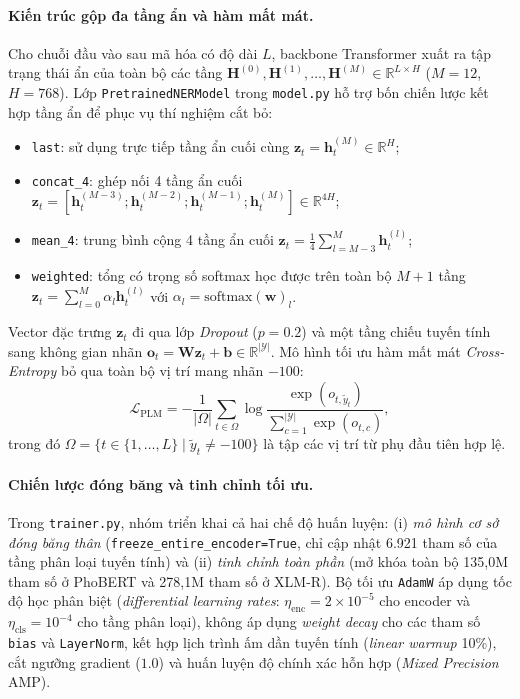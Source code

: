 \paragraph{Kiến trúc gộp đa tầng ẩn và hàm mất mát.}
Cho chuỗi đầu vào sau mã hóa có độ dài $L$, backbone Transformer xuất ra tập trạng thái ẩn của toàn bộ các tầng $\mathbf{H}^{(0)}, \mathbf{H}^{(1)}, \dots, \mathbf{H}^{(M)} \in \mathbb{R}^{L \times H}$ ($M=12$, $H=768$). Lớp \texttt{PretrainedNERModel} trong \texttt{model.py} hỗ trợ bốn chiến lược kết hợp tầng ẩn để phục vụ thí nghiệm cắt bỏ:
\begin{itemize}
    \item \texttt{last}: sử dụng trực tiếp tầng ẩn cuối cùng $\mathbf{z}_t = \mathbf{h}_t^{(M)} \in \mathbb{R}^{H}$;
    \item \texttt{concat\_4}: ghép nối 4 tầng ẩn cuối $\mathbf{z}_t = [\mathbf{h}_t^{(M-3)}; \mathbf{h}_t^{(M-2)}; \mathbf{h}_t^{(M-1)}; \mathbf{h}_t^{(M)}] \in \mathbb{R}^{4H}$;
    \item \texttt{mean\_4}: trung bình cộng 4 tầng ẩn cuối $\mathbf{z}_t = \frac{1}{4}\sum_{l=M-3}^{M} \mathbf{h}_t^{(l)}$;
    \item \texttt{weighted}: tổng có trọng số softmax học được trên toàn bộ $M+1$ tầng $\mathbf{z}_t = \sum_{l=0}^{M} \alpha_l \mathbf{h}_t^{(l)}$ với $\alpha_l = \text{softmax}(\mathbf{w})_l$.
\end{itemize}
Vector đặc trưng $\mathbf{z}_t$ đi qua lớp \textit{Dropout} ($p=0.2$) và một tầng chiếu tuyến tính sang không gian nhãn $\mathbf{o}_t = \mathbf{W}\mathbf{z}_t + \mathbf{b} \in \mathbb{R}^{|\mathcal{Y}|}$. Mô hình tối ưu hàm mất mát \textit{Cross-Entropy} bỏ qua toàn bộ vị trí mang nhãn $-100$:
\begin{equation}
    \mathcal{L}_{\text{PLM}} = -\frac{1}{|\Omega|} \sum_{t \in \Omega} \log \frac{\exp(o_{t, \tilde{y}_t})}{\sum_{c=1}^{|\mathcal{Y}|} \exp(o_{t, c})},
\end{equation}
trong đó $\Omega = \{t \in \{1, \dots, L\} \mid \tilde{y}_t \neq -100\}$ là tập các vị trí từ phụ đầu tiên hợp lệ.

\paragraph{Chiến lược đóng băng và tinh chỉnh tối ưu.}
Trong \texttt{trainer.py}, nhóm triển khai cả hai chế độ huấn luyện: (i) \textit{mô hình cơ sở đóng băng thân} (\texttt{freeze\_entire\_encoder=True}, chỉ cập nhật 6.921 tham số của tầng phân loại tuyến tính) và (ii) \textit{tinh chỉnh toàn phần} (mở khóa toàn bộ 135,0M tham số ở PhoBERT và 278,1M tham số ở XLM-R). Bộ tối ưu \texttt{AdamW} áp dụng tốc độ học phân biệt (\textit{differential learning rates}: $\eta_{\text{enc}} = 2\times 10^{-5}$ cho encoder và $\eta_{\text{cls}} = 10^{-4}$ cho tầng phân loại), không áp dụng \textit{weight decay} cho các tham số \texttt{bias} và \texttt{LayerNorm}, kết hợp lịch trình ấm dần tuyến tính (\textit{linear warmup} 10\%), cắt ngưỡng gradient ($1.0$) và huấn luyện độ chính xác hỗn hợp (\textit{Mixed Precision} AMP).

